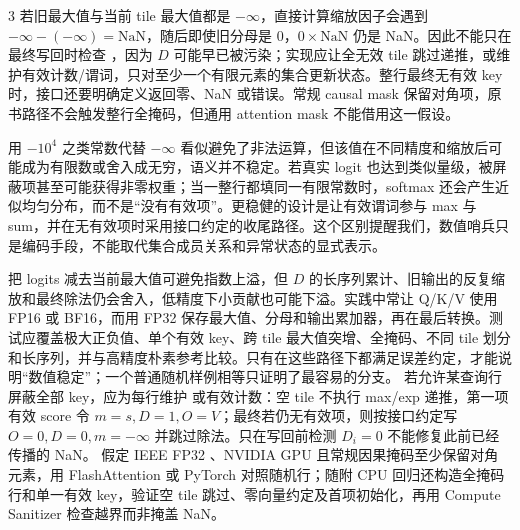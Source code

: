 \begin{solutionexercise}{3}
若旧最大值与当前 tile 最大值都是 $-\infty$，直接计算缩放因子会遇到 $-\infty-(-\infty)=\mathrm{NaN}$，随后即使旧分母是 0，$0\times\mathrm{NaN}$ 仍是 NaN。因此不能只在最终写回时检查 ，因为 $D$ 可能早已被污染；实现应让全无效 tile 跳过递推，或维护有效计数/谓词，只对至少一个有限元素的集合更新状态。整行最终无有效 key 时，接口还要明确定义返回零、NaN 或错误。常规 causal mask 保留对角项，原书路径不会触发整行全掩码，但通用 attention mask 不能借用这一假设。

用 $-10^4$ 之类常数代替 $-\infty$ 看似避免了非法运算，但该值在不同精度和缩放后可能成为有限数或舍入成无穷，语义并不稳定。若真实 logit 也达到类似量级，被屏蔽项甚至可能获得非零权重；当一整行都填同一有限常数时，softmax 还会产生近似均匀分布，而不是“没有有效项”。更稳健的设计是让有效谓词参与 max 与 sum，并在无有效项时采用接口约定的收尾路径。这个区别提醒我们，数值哨兵只是编码手段，不能取代集合成员关系和异常状态的显式表示。

把 logits 减去当前最大值可避免指数上溢，但 $D$ 的长序列累计、旧输出的反复缩放和最终除法仍会舍入，低精度下小贡献也可能下溢。实践中常让 Q/K/V 使用 FP16 或 BF16，而用 FP32 保存最大值、分母和输出累加器，再在最后转换。测试应覆盖极大正负值、单个有效 key、跨 tile 最大值突增、全掩码、不同 tile 划分和长序列，并与高精度朴素参考比较。只有在这些路径下都满足误差约定，才能说明“数值稳定”；一个普通随机样例相等只证明了最容易的分支。
\variantheading 若允许某查询行屏蔽全部 key，应为每行维护  或有效计数：空 tile 不执行 max/exp 递推，第一项有效 score 令 $m=s,D=1,O=V$；最终若仍无有效项，则按接口约定写 $O=0,D=0,m=-\infty$ 并跳过除法。只在写回前检测 $D_i=0$ 不能修复此前已经传播的 NaN。
\practiceheading 假定 IEEE FP32 、NVIDIA GPU 且常规因果掩码至少保留对角元素，用 FlashAttention 或 PyTorch  对照随机行；随附 CPU 回归还构造全掩码行和单一有效 key，验证空 tile 跳过、零向量约定及首项初始化，再用 Compute Sanitizer 检查越界而非掩盖 NaN。
\end{solutionexercise}

